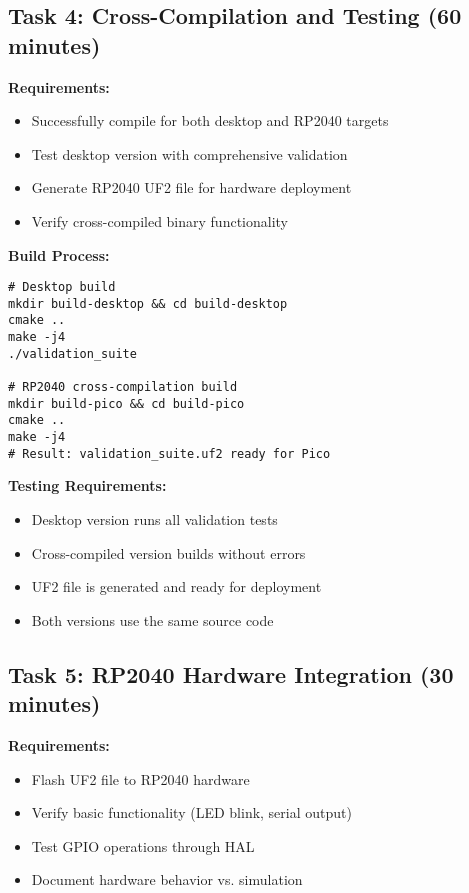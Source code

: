 \documentclass[11pt,a4paper]{article}
\begin{document}
\subsection{Task 4: Cross-Compilation and Testing (60 minutes)}

\textbf{Requirements:}
\begin{itemize}
    \item Successfully compile for both desktop and RP2040 targets
    \item Test desktop version with comprehensive validation
    \item Generate RP2040 UF2 file for hardware deployment
    \item Verify cross-compiled binary functionality
\end{itemize}

\textbf{Build Process:}
\begin{verbatim}
# Desktop build
mkdir build-desktop && cd build-desktop
cmake ..
make -j4
./validation_suite

# RP2040 cross-compilation build
mkdir build-pico && cd build-pico
cmake ..
make -j4
# Result: validation_suite.uf2 ready for Pico
\end{verbatim}

\textbf{Testing Requirements:}
\begin{itemize}
    \item Desktop version runs all validation tests
    \item Cross-compiled version builds without errors
    \item UF2 file is generated and ready for deployment
    \item Both versions use the same source code
\end{itemize}

\subsection{Task 5: RP2040 Hardware Integration (30 minutes)}

\textbf{Requirements:}
\begin{itemize}
    \item Flash UF2 file to RP2040 hardware
    \item Verify basic functionality (LED blink, serial output)
    \item Test GPIO operations through HAL
    \item Document hardware behavior vs. simulation
\end{itemize}
\end{document}
